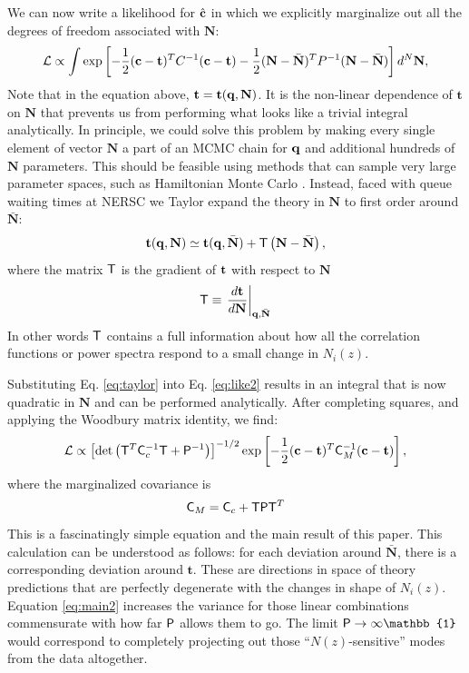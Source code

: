 \documentclass[a4paper,11pt]{article}
\newcommand{\vt}{\mathbf{t}}
\newcommand{\vN}{\mathbf{N}}
\begin{document}
      We can now write a likelihood for $\hat{\bf c}$ in which we explicitly marginalize out all the degrees of freedom associated with $\vN$:
      \begin{equation}
        \mathcal{L} \propto  \int \exp\left [-\frac{1}{2} ({\bf c}-\vt)^T C^{-1} ({\bf c}-\vt) -\frac{1}{2} (\vN - \bar{\vN})^T P^{-1} (\vN -\bar{\vN}) \right]  d^N\vN, \label{eq:like2}
      \end{equation}
      Note that in the equation above, $\vt=\vt({\bf q},\vN)$. It is the non-linear dependence of $\vt$ on $\vN$ that prevents us from performing what looks like a trivial integral analytically. In principle, we could solve this problem by making every single element of vector $\vN$ a part of an MCMC chain for ${\bf q}$ and additional hundreds of $\vN$ parameters. This should be feasible using methods that can sample very large parameter spaces, such as Hamiltonian Monte Carlo \cite{1987PhLB..195..216D}. Instead, faced with queue waiting times at NERSC we Taylor expand the theory in $\vN$ to first order around $\bar{\vN}$:
      \begin{equation}
        \vt({\bf q},\vN) \simeq \vt({\bf q},\bar{\vN}) + {\sf T} \left(\vN - \bar{\vN} \right), \label{eq:taylor}
      \end{equation}
      where the matrix ${\sf T}$ is the gradient of ${\bf t}$ with respect to $\vN$
      \begin{equation}
        {\sf T}\equiv \left.\frac{d{\bf t}}{d\vN}\right|_{{\bf q},\bar{\vN}}
        \label{eq:Tmat}
      \end{equation}
      In other words ${\sf T}$ contains a full information about how all the correlation functions or power spectra respond to a small change in $N_i(z)$.

      Substituting Eq. \ref{eq:taylor} into Eq. \ref{eq:like2} results in an integral that is now quadratic in $\vN$ and can be performed analytically. After completing squares, and applying the Woodbury matrix identity, we find:
      \begin{equation}
        \mathcal{L} \propto \left[{\rm det}\left({\sf T}^T {\sf C}_c^{-1} {\sf T} +{\sf P}^{-1}\right)\right]^{-1/2} \exp\left [-\frac{1}{2} ({\bf c}-\vt)^T {\sf C}_M^{-1} ({\bf c}-\vt) \right], \label{eq:main1}
      \end{equation}
      where the  marginalized covariance is
      \begin{equation}
        {\sf C}_M = {\sf C}_c + {\sf T}{\sf P}{\sf T}^T \label{eq:main2}
      \end{equation}
      This is a fascinatingly simple equation and the main result of this paper. This calculation can be understood as follows: for each deviation around $\bar{\vN}$, there is a corresponding deviation around $\vt$. These are directions in space of theory predictions that are perfectly degenerate with the changes in shape of $N_i(z)$.  Equation \ref{eq:main2}  increases the variance for those linear combinations commensurate with how far ${\sf P}$ allows them to go. The limit ${\sf P}\rightarrow\infty\mathbb{1}$ would correspond to completely projecting out those ``$N(z)$-sensitive'' modes from the data altogether. 
\end{document}
